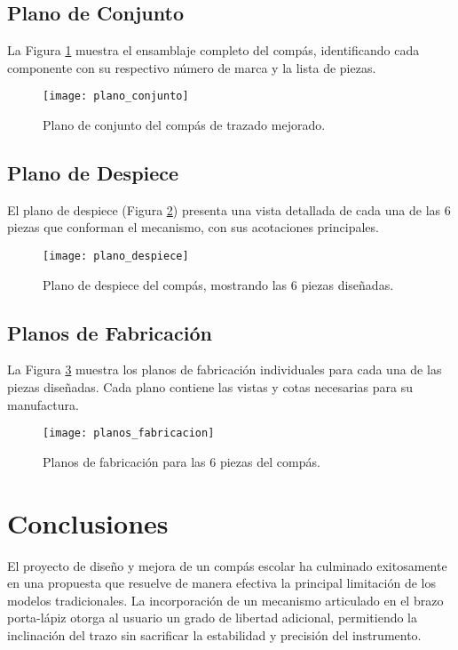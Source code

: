 \documentclass[11pt, a4paper]{article}
\begin{document}
\subsection{Plano de Conjunto}
La Figura \ref{fig:conjunto} muestra el ensamblaje completo del compás, identificando cada componente con su respectivo número de marca y la lista de piezas.

\begin{figure}[H]
    \centering
    \texttt{[image: plano\_conjunto]}
    \caption{Plano de conjunto del compás de trazado mejorado.}
    \label{fig:conjunto}
\end{figure}

\subsection{Plano de Despiece}
El plano de despiece (Figura \ref{fig:despiece}) presenta una vista detallada de cada una de las 6 piezas que conforman el mecanismo, con sus acotaciones principales.

\begin{figure}[H]
    \centering
    \texttt{[image: plano\_despiece]}
    \caption{Plano de despiece del compás, mostrando las 6 piezas diseñadas.}
    \label{fig:despiece}
\end{figure}

\subsection{Planos de Fabricación}
La Figura \ref{fig:fabricacion} muestra los planos de fabricación individuales para cada una de las piezas diseñadas. Cada plano contiene las vistas y cotas necesarias para su manufactura.

\begin{figure}[H]
    \centering
    \texttt{[image: planos\_fabricacion]}
    \caption{Planos de fabricación para las 6 piezas del compás.}
    \label{fig:fabricacion}
\end{figure}

\newpage
\section{Conclusiones}
El proyecto de diseño y mejora de un compás escolar ha culminado exitosamente en una propuesta que resuelve de manera efectiva la principal limitación de los modelos tradicionales. La incorporación de un mecanismo articulado en el brazo porta-lápiz otorga al usuario un grado de libertad adicional, permitiendo la inclinación del trazo sin sacrificar la estabilidad y precisión del instrumento.
\end{document}
